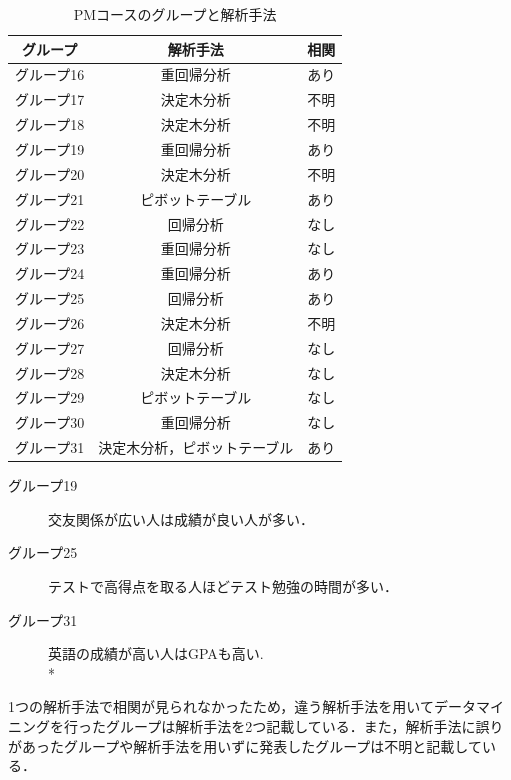 \begin{table}[hbtp]
  \caption{PMコースのグループと解析手法}
  \label{table:data_type}
  \centering
  \begin{tabular}{|c|c|c|}
    \hline
    グループ & 解析手法 & 相関  \\ \hline
    グループ16 & 重回帰分析 & あり \\ \hline
    グループ17 & 決定木分析 & 不明 \\ \hline
    グループ18 & 決定木分析 & 不明 \\ \hline
    グループ19 & 重回帰分析 & あり \\ \hline
    グループ20 & 決定木分析 & 不明 \\ \hline
    グループ21 & ピボットテーブル & あり \\ \hline
    グループ22 & 回帰分析 & なし \\ \hline
    グループ23 & 重回帰分析 & なし \\ \hline
    グループ24 & 重回帰分析 & あり \\ \hline
    グループ25 & 回帰分析 & あり \\ \hline
    グループ26 & 決定木分析 & 不明 \\ \hline
    グループ27 & 回帰分析 & なし \\ \hline
    グループ28 & 決定木分析 & なし \\ \hline
    グループ29 & ピボットテーブル & なし \\ \hline
    グループ30 & 重回帰分析 & なし \\ \hline
    グループ31 & 決定木分析，ピボットテーブル & あり \\ \hline
  \end{tabular}
\end{table}

\begin{description}
  \item[グループ19] 交友関係が広い人は成績が良い人が多い．
  \item[グループ25] テストで高得点を取る人ほどテスト勉強の時間が多い．
  \item[グループ31] 英語の成績が高い人はGPAも高い.  \vspace{0.1in} \\*
\end{description}

1つの解析手法で相関が見られなかったため，違う解析手法を用いてデータマイニングを行ったグループは解析手法を2つ記載している．また，解析手法に誤りがあったグループや解析手法を用いずに発表したグループは不明と記載している．


